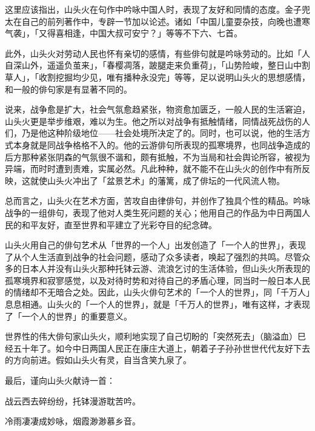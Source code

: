 {

这里应该指出，山头火在句作中吟咏中国人时，表现了友好和同情的态度。金子兜太在自己的前列著作中，专辟一节加以论述。诸如「中国儿童耍杂技，向晚也遭寒气袭」，「又得喜相逢，中国大叔可安宁？」等等不下六、七首。

此外，山头火对劳动人民也怀有亲切的感情，有些俳句就是吟咏劳动的。比如「人自深山外，遥遥负茧来」，「春樱凋落，跛腿走来负重荷」，「山势险峻，整日山中割草人」，「收割挖掘均少见，唯有播种永没完」等等，足以说明山头火的思想感情，和一般的俳句家是有显著不同的。

说来，战争愈是扩大，社会气氛愈趋紧张，物资愈加匮乏，一般人民的生活窘迫，山头火更是举步维艰，难以为生。他之所以对战争有抵触情绪，同情战死战伤的人们，乃是他这种阶级地位——社会处境所决定了的。同时，也可以说，他的生活方式本身就是同战争格格不入的。他的云游俳句所表现的孤寒境界，也同战争造成的后方那种紧张阴森的气氛很不谐和，颇有抵触，不为当局和社会舆论所容，被视为异端，而时时遭到责难，实属必然。凡此种种，就不能不在山头火的创作中有所反映，这就使山头火冲出了「盆景艺术」的藩篱，成了俳坛的一代风流人物。

总而言之，山头火在艺术方面，苦攻自由律俳句，并创作了独具个性的精品。吟咏战争的一组俳句，表现了他对人类生死问题的关心；他用自己的作品为中日两国人民的和平友好，直至世界和平建立了光彩夺目的纪念碑。

山头火用自己的俳句艺术从「世界的一个人」出发创造了「一个人的世界」，表现了从个人生活直到战争的社会问题，感动了众多读者，唤起了强烈的共鸣。尽管众多的日本人并没有山头火那种托钵云游、流浪乞讨的生活体验，但山头火所表现的孤寒境界和寂寥感觉，以及对待时势和对待自己的矛盾心理，同当时一般日本人民的情绪却不无暗合之处。因此，山头火俳句艺术的「一个人的世界」，同「千万人」息息相通。山头火的「一个人的世界」，就是「千万人的世界」，唯有这样，才表现了「一个人的世界」的重要意义。

世界性的伟大俳句家山头火，顺利地实现了自己切盼的「突然死去」（脑溢血）巳经五十年了。如今中日两国人民正在康庄大道上，朝着子子孙孙世世代代友好下去的方向前进。假如山头火有灵，自当含笑九泉了。

最后，谨向山头火献诗一首：
\begin{center}
    战云西去碎纷纷，托钵漫游耽苦吟。

    冷雨凄凄成妙咏，烟霞渺渺慕乡音。


\end{center}}
